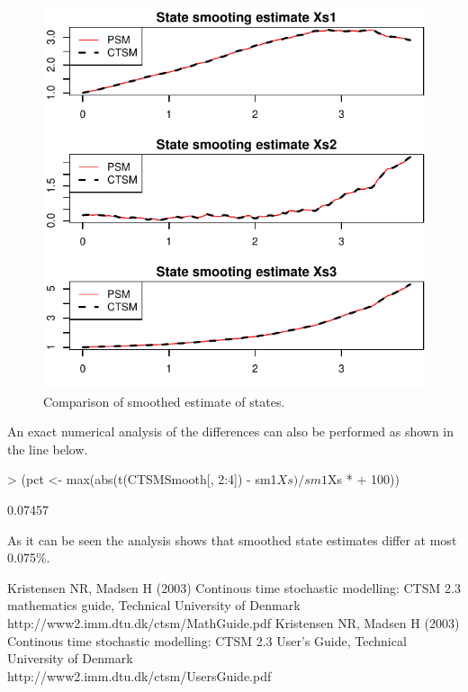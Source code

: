 \documentclass{article}
\renewenvironment{Schunk}
{\begin{center} \begin{boxedminipage}{0.95\textwidth} }
{\end{boxedminipage}\end{center}}
\begin{document}
\begin{figure}[hptb]
\begin{center}
\includegraphics{PSMvsCTSM-figure2}
\end{center}
\caption{Comparison of smoothed estimate of states. }
\label{fig:fig2}
\end{figure}

An exact numerical analysis of the differences can also be performed
as shown in the line below.



\begin{Schunk}
\begin{Sinput}
> (pct <- max(abs(t(CTSMSmooth[, 2:4]) - sm1$Xs)/sm1$Xs * 
+     100))
\end{Sinput}
\begin{Soutput}
[1] 0.07457
\end{Soutput}
\end{Schunk}


 As it can be seen the analysis shows that
smoothed state estimates differ at most 0.075\%.


\small
\begin{thebibliography}{99}
    Kristensen NR, Madsen H (2003) Continous time stochastic
    modelling: CTSM 2.3 mathematics guide, Technical University of
    Denmark \\
    http://www2.imm.dtu.dk/ctsm/MathGuide.pdf
    Kristensen NR, Madsen H (2003) Continous time stochastic
    modelling: CTSM 2.3 User's Guide, Technical University of
    Denmark \\
    http://www2.imm.dtu.dk/ctsm/UsersGuide.pdf
  
    
\end{thebibliography}
\end{document}
